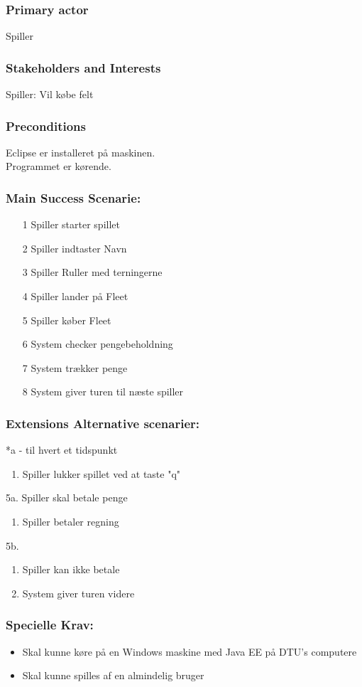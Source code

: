 \subsubsection*{Primary actor}
Spiller
\subsubsection*{Stakeholders and Interests}
Spiller: Vil købe felt
\subsubsection*{Preconditions}
Eclipse er installeret på maskinen.
\\
Programmet er kørende.
\subsubsection*{Main Success Scenarie:}
\begin{enumerate}
\item[1] Spiller starter spillet
\item[2] Spiller indtaster Navn
\item[3] Spiller Ruller med terningerne
\item[4] Spiller lander på Fleet
\item[5] Spiller køber Fleet
\item[6] System checker pengebeholdning
\item[7] System trækker penge
\item[8] System giver turen til næste spiller
\end{enumerate}
\subsubsection*{Extensions Alternative scenarier:}
*a - til hvert et tidspunkt
\begin{enumerate}
\item Spiller lukker spillet ved at taste "q"
\end{enumerate}
5a. Spiller skal betale penge
\begin{enumerate}
\item  Spiller betaler regning
\end{enumerate}
5b.
\begin{enumerate}
\item  Spiller kan ikke betale
\item  System giver turen videre
\end{enumerate}
\subsubsection*{Specielle Krav:}
\begin{itemize}
\item Skal kunne køre på en Windows maskine med Java EE på DTU's computere
\item Skal kunne spilles af en almindelig bruger
\end{itemize}
